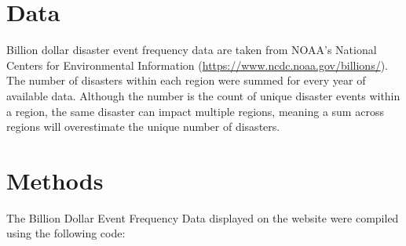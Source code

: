 \documentclass[
]{book}
\begin{document}
\hypertarget{data-21}{%
\section{Data}\label{data-21}}

Billion dollar disaster event frequency data are taken from NOAA's National Centers for Environmental Information (\url{https://www.ncdc.noaa.gov/billions/}). The number of disasters within each region were summed for every year of available data. Although the number is the count of unique disaster events within a region, the same disaster can impact multiple regions, meaning a sum across regions will overestimate the unique number of disasters.

\hypertarget{methods-21}{%
\section{Methods}\label{methods-21}}

The Billion Dollar Event Frequency Data displayed on the website were compiled using the following code:
\end{document}
